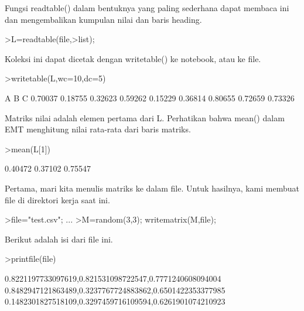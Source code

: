 \documentclass[a4paper,10pt]{article}
\begin{document}
\begin{eulernotebook}
\begin{eulercomment}
\begin{eulercomment}
\begin{eulercomment}
\begin{eulercomment}
\begin{eulercomment}
\begin{eulercomment}
\begin{eulercomment}
\begin{eulercomment}
\begin{eulercomment}
\begin{eulercomment}
\begin{eulercomment}
\begin{eulercomment}
\begin{eulercomment}
\begin{eulercomment}
\begin{eulercomment}
\begin{eulercomment}
\begin{eulercomment}
\begin{eulercomment}
\begin{euleroutput}
\end{euleroutput}
\begin{eulercomment}
Fungsi readtable() dalam bentuknya yang paling sederhana dapat membaca
ini dan mengembalikan kumpulan nilai dan baris heading.
\end{eulercomment}
\begin{eulerprompt}
>L=readtable(file,>list);
\end{eulerprompt}
\begin{eulercomment}
Koleksi ini dapat dicetak dengan writetable() ke notebook, atau ke
file.
\end{eulercomment}
\begin{eulerprompt}
>writetable(L,wc=10,dc=5)
\end{eulerprompt}
\begin{euleroutput}
           A         B         C
     0.70037   0.18755   0.32623
     0.59262   0.15229   0.36814
     0.80655   0.72659   0.73326
\end{euleroutput}
\begin{eulercomment}
Matriks nilai adalah elemen pertama dari L. Perhatikan bahwa mean()
dalam EMT menghitung nilai rata-rata dari baris matriks.
\end{eulercomment}
\begin{eulerprompt}
>mean(L[1])
\end{eulerprompt}
\begin{euleroutput}
    0.40472 
    0.37102 
    0.75547 
\end{euleroutput}
\begin{eulercomment}
Pertama, mari kita menulis matriks ke dalam file. Untuk hasilnya, kami
membuat file di direktori kerja saat ini.
\end{eulercomment}
\begin{eulerprompt}
>file="test.csv";  ...
>M=random(3,3); writematrix(M,file);
\end{eulerprompt}
\begin{eulercomment}
Berikut adalah isi dari file ini.
\end{eulercomment}
\begin{eulerprompt}
>printfile(file)
\end{eulerprompt}
\begin{euleroutput}
  0.8221197733097619,0.821531098722547,0.7771240608094004
  0.8482947121863489,0.3237767724883862,0.6501422353377985
  0.1482301827518109,0.3297459716109594,0.6261901074210923
  

\end{euleroutput}
\end{eulercomment}
\end{eulercomment}
\end{eulercomment}
\end{eulercomment}
\end{eulercomment}
\end{eulercomment}
\end{eulercomment}
\end{eulercomment}
\end{eulercomment}
\end{eulercomment}
\end{eulercomment}
\end{eulercomment}
\end{eulercomment}
\end{eulercomment}
\end{eulercomment}
\end{eulercomment}
\end{eulercomment}
\end{eulercomment}
\end{eulernotebook}
\end{document}
